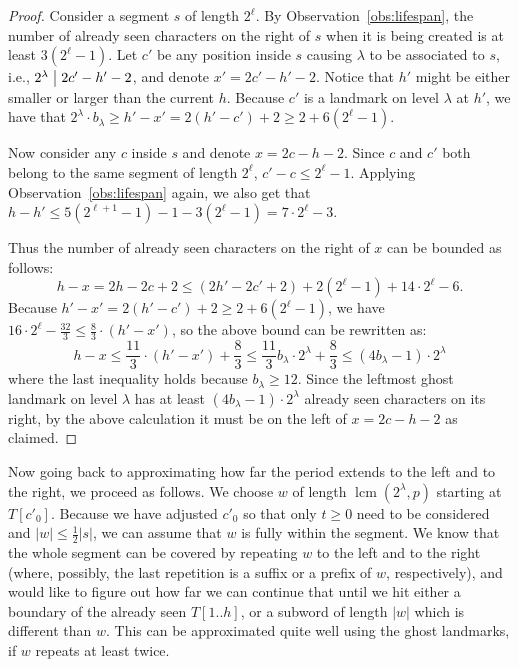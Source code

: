 \documentclass{article}[11pt,letter]
\newcommand{\ie}{i.e.\xspace}
\newcommand{\head}{h}
\newcommand{\divides}{\bigm|}
\newcommand{\level}{\lambda}
\DeclareMathOperator{\lcm}{lcm}
\newcommand{\kpers}{\ensuremath{p}}
\begin{document}
\begin{proof}
Consider a segment $s$ of length $2^{\ell}$. By Observation~\ref{obs:lifespan}, the number of already seen characters on the right
of $s$ when it is being created is at least $3(2^{\ell}-1)$. Let $c'$ be any position inside $s$
causing $\level$ to be associated to $s$, \ie, $2^{\level} \divides 2c'-\head'-2$, and denote
$x' = 2c'-\head'-2$. Notice that $\head'$ might be either smaller or larger than the current $\head$. Because $c'$ is a landmark
on level $\level$ at $\head'$, we have that $2^\level \cdot b_\level \ge \head' - x' = 2(\head' - c')  + 2 \ge 2 + 6(2^{\ell}-1)$.

Now consider any $c$ inside $s$ and denote $x = 2c - \head -2$. Since $c$ and $c'$ both belong to the same segment of length $2^{\ell}$,
$c'-c \le 2^{\ell}-1$. Applying Observation~\ref{obs:lifespan} again, we also get that
$\head-\head' \le 5(2^{\ell+1}-1)-1 - 3(2^{\ell}-1) = 7\cdot 2^{\ell} - 3$.

Thus the number of already seen characters on the right of $x$ can be bounded as follows:
\[\head - x = 2\head - 2c + 2 \le (2\head' - 2c' + 2) + 2(2^{\ell}-1) + 14 \cdot 2^{\ell} - 6.\]
Because $\head' - x' = 2(\head' - c')  + 2 \ge 2 + 6(2^{\ell}-1) $, we have $16\cdot 2^{\ell} - \frac{32}{3} \le \frac{8}{3}\cdot (\head' -x')$, so
the above bound can be rewritten as:
\[\head - x \le \frac{11}{3} \cdot (\head' -x') +\frac{8}{3}\le \frac{11}{3}b_\level\cdot 2^\level +\frac{8}{3} \le (4 b_\level-1) \cdot 2^\level\]
where the last inequality holds because $b_\level \ge 12$.
Since the leftmost ghost landmark on level $\level$ has at least $(4 b_\level-1) \cdot 2^\level$ already seen characters on its right,
by the above calculation it must be on the left of $x=2c-\head-2$ as claimed.
\end{proof}

Now going back to approximating how far the period extends to the left and to the right, we proceed as follows.
We choose $w$ of length $\lcm(2^{\level},\kpers)$ starting at $T[c'_0]$. Because we have adjusted $c'_{0}$ so that only $t\geq 0$ need to
be considered and $|w| \leq \frac{1}{2}|s|$, we can assume that $w$ is fully within the segment.
We know that the whole segment can be covered by repeating $w$ to the left and to the right (where, possibly, the last repetition is
a suffix or a prefix of $w$, respectively), and would like to figure out how far we can continue that until we hit either a boundary of the already seen
$T[1..\head]$, or a subword of length $|w|$ which is different than $w$. This can be approximated quite well using the ghost landmarks,
if $w$ repeats at least twice.
\end{document}
